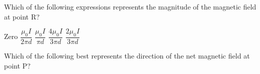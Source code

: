 \begin{questions}
\setcounter{question}{24}

\question
Which of the following expressions represents the magnitude of the magnetic field at point R?

\begin{oneparchoices}
    \choice Zero
    \choice $\dfrac{\mu_{0} I}{2 \pi d}$ 
    \choice $\dfrac{\mu_{0} I}{\pi d}$ 
    \choice $\dfrac{4 \mu_{0} I}{3 \pi d}$ 
    \choice $\dfrac{2 \mu_{0} I}{3 \pi d}$
\end{oneparchoices}

\question
Which of the following best represents the direction of the net magnetic field at point P?

\begin{oneparchoices}
    \choice {}
    \choice {}
    \choice {}
    \choice {}
    \choice {}
\end{oneparchoices}

\end{questions}
